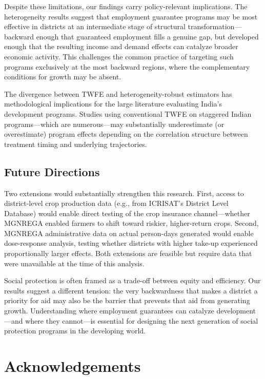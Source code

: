 \documentclass[12pt]{article}
\begin{document}
Despite these limitations, our findings carry policy-relevant implications. The heterogeneity results suggest that employment guarantee programs may be most effective in districts at an intermediate stage of structural transformation---backward enough that guaranteed employment fills a genuine gap, but developed enough that the resulting income and demand effects can catalyze broader economic activity. This challenges the common practice of targeting such programs exclusively at the most backward regions, where the complementary conditions for growth may be absent.

The divergence between TWFE and heterogeneity-robust estimators has methodological implications for the large literature evaluating India's development programs. Studies using conventional TWFE on staggered Indian programs---which are numerous---may substantially underestimate (or overestimate) program effects depending on the correlation structure between treatment timing and underlying trajectories.

\subsection{Future Directions}

Two extensions would substantially strengthen this research. First, access to district-level crop production data (e.g., from ICRISAT's District Level Database) would enable direct testing of the crop insurance channel---whether MGNREGA enabled farmers to shift toward riskier, higher-return crops. Second, MGNREGA administrative data on actual person-days generated would enable dose-response analysis, testing whether districts with higher take-up experienced proportionally larger effects. Both extensions are feasible but require data that were unavailable at the time of this analysis.

Social protection is often framed as a trade-off between equity and efficiency. Our results suggest a different tension: the very backwardness that makes a district a priority for aid may also be the barrier that prevents that aid from generating growth. Understanding where employment guarantees can catalyze development---and where they cannot---is essential for designing the next generation of social protection programs in the developing world.

\section*{Acknowledgements}
\end{document}
